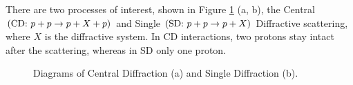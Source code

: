 There are two processes of interest, shown in Figure \ref{fig:sdcdgraph} (a, b), the Central $\left(\textnormal{CD: }p+p\to p+X+p\right)$ and Single $\left(\textnormal{SD: }p+p\to p+X\right)$ Diffractive scattering, where $X$ is the diffractive system. In CD interactions, two protons stay intact after the scattering, whereas in SD only one proton.
\begin{figure}[hb]
	\centering
	\parbox{0.484\textwidth}{
		\centering
		\begin{subfigure}[b]{\linewidth}{
				}
		\end{subfigure}
	}
	\quad
	\parbox{0.484\textwidth}{
		\centering
		\begin{subfigure}[b]{\linewidth}{
				}
		\end{subfigure}
	}%
	\caption[Diagrams of Central Diffraction and Single Diffraction]{Diagrams of Central Diffraction (a) and Single Diffraction (b).}
	 \label{fig:sdcdgraph}
\end{figure}
